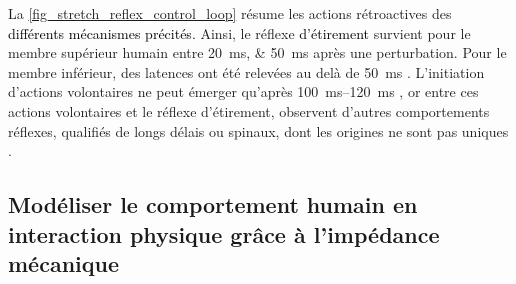 
\tikzexternaldisable

La \cref{fig_stretch_reflex_control_loop} résume les actions rétroactives des \textcolor{black}{différents mécanismes précités.} %
Ainsi, le réflexe \textcolor{black}{d'étirement} survient pour le membre supérieur humain entre \SIlist{20;50}{\milli\second} \parencite{lacquaniti_transient_1991, kurtzer_long-latency_2008, lakatos_conditioning_2011, pruszynski_long-latency_2011} après une perturbation. Pour le membre inférieur, des latences ont été relevées au delà de \SI{50}{\milli\second} \parencite{allum_mechanical_1982, sinkjaer_muscle_1988, toft_mechanical_1989}. L'initiation d'actions volontaires ne peut émerger qu'après \SIrange{100}{120}{\milli\second} \parencite{libet_unconscious_1985, kurtzer_long-latency_2008, lakatos_conditioning_2011, pruszynski_long-latency_2011}, or entre ces actions volontaires et le réflexe d'étirement, \parencite{kurtzer_long-latency_2008, lakatos_conditioning_2011, pruszynski_long-latency_2011} observent d'autres comportements réflexes, qualifiés de longs délais ou spinaux, dont les origines ne sont pas uniques \parencite{pruszynski_long-latency_2011}.

\subsection{Modéliser le comportement humain en interaction physique grâce à l'impédance mécanique} \label{chap1_sec_modelling_human_sub_2}

